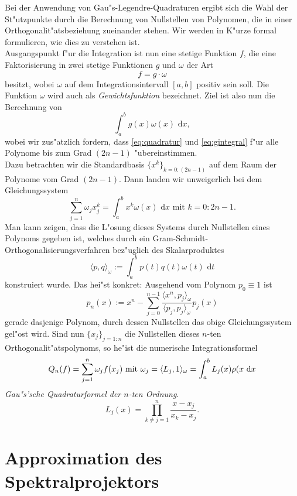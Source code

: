Bei der Anwendung von Gau"s-Legendre-Quadraturen ergibt sich die Wahl der St"utzpunkte durch die Berechnung von Nullstellen von Polynomen, die in einer Orthogonalit"atsbeziehung zueinander stehen.
Wir werden in K"urze formal formulieren, wie dies zu verstehen ist.\\

Ausgangspunkt f"ur die Integration ist nun eine stetige Funktion $f$, die eine Faktorisierung in zwei stetige Funktionen $g$ und $\omega$ der Art
\[
f = g\cdot \omega
\]
besitzt, wobei $\omega$ auf dem Integrationsintervall $[a,b]$ positiv sein soll. Die Funktion $\omega$ wird auch als \emph{Gewichtsfunktion} bezeichnet.
Ziel ist also nun die Berechnung von
\begin{equation}\label{eq:gintegral}
\int_a^b g(x)\omega(x) \text{ d}x,
\end{equation}
wobei wir zus"atzlich fordern, dass \eqref{eq:quadratur} und \eqref{eq:gintegral} f"ur alle Polynome bis zum Grad $(2n-1)$ "ubereinstimmen.\\

Dazu betrachten wir die Standardbasis $\{x^k\}_{k=0:(2n-1)}$ auf dem Raum der Polynome vom
Grad $(2n-1)$. Dann landen wir unweigerlich bei dem
Gleichungssystem
\[
\sum_{j=1}^n \omega_j x_j^k = \int_a^b x^k \omega(x) \text{ d}x \text{ mit } k = 0:2n-1.
\]
Man kann zeigen, dass die L"osung dieses Systems durch Nullstellen eines Polynoms gegeben ist, welches durch
ein Gram-Schmidt-Orthogonalisierungsverfahren bez"uglich des Skalarproduktes
\[
\langle p,q\rangle_\omega := \int_a^b p(t) q(t)\omega(t) \text{ d}t
\]
konstruiert wurde. Das hei"st konkret: Ausgehend vom Polynom $p_0 \equiv 1$ ist
\[
p_n(x) := x^n - \sum_{j=0}^{n-1} \frac{\langle x^n, p_j \rangle_\omega}{\langle p_j, p_j\rangle_\omega} p_j (x)
\]
gerade dasjenige Polynom, durch dessen Nullstellen das obige Gleichungssystem gel"ost wird. Sind nun
$\{x_j\}_{j=1:n}$ die Nullstellen dieses $n$-ten Orthogonalit"atspolynoms, so he"ist die numerische
Integrationsformel
\[
Q_n(f) = \sum_{j=1}^n \omega_j f(x_j) \text{ mit }
\omega_j = \langle L_j, 1 \rangle_\omega
= \int_a^b L_j(x)\rho(x\text{ d}x
\]
\emph{Gau"s'sche Quadraturformel der $n$-ten Ordnung}.
\[
L_j(x) = \prod_{k\neq j=1}^n \frac{x-x_j}{x_k - x_j}.
\]

\newpage

\section{Approximation des Spektralprojektors}

